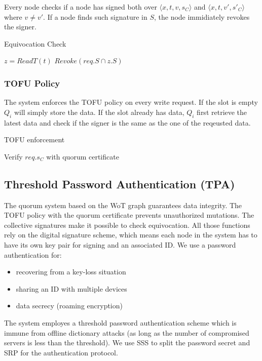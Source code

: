 \documentclass[twoside,twocolumn,10pt,fleqn]{article}
\begin{document}
Every node checks if a node has signed both over $\langle x, t, v,
s_C \rangle$
and $\langle x, t, v', s'_C \rangle$ where $v \neq v'$. If a node
finds such signature in $S$, the node immidiately revokes the signer.
\begin{algorithm}
  \caption{Equivocation Check}
  \SetAlgoNoLine
  $z = ReadT(t)$\;
  {
    $Revoke(req.S \cap z.S)$\;
  }
\end{algorithm}

\subsubsection*{TOFU Policy}
The system enforces the TOFU policy on every write request. If the
slot is empty $Q_i$ will simply store the data. If the slot already
has data, $Q_i$ first retrieve the latest data and check if the
signer is the same as the one of the reqeusted data.
\begin{algorithm}
  \caption{TOFU enforcement}
  \SetAlgoNoLine
  Verify $req.s_C$ with quorum certificate\;
\end{algorithm}

\subsection{Threshold Password Authentication (TPA)}
\label{threshold}
The quorum system based on the WoT graph guarantees data
integrity. The TOFU policy with the quorum certificate prevents
unauthorized mutations. The collective signatures make it possible to
check equivocation. All those functions rely on the digital signature
scheme, which means each node in the system has to have its own key
pair for signing and an associated ID. We use a password
authentication for:
\begin{itemize}
\item recovering from a key-loss situation
\item sharing an ID with multiple devices
\item data secrecy (roaming encryption)
\end{itemize}

The system employes a threshold password authentication scheme which
is immune from offline dictionary attacks (as long as the number of
compromised servers is less than the threshold). We use SSS to split
the password secret and SRP \cite{srp} for the authentication
protocol.\\
\end{document}
